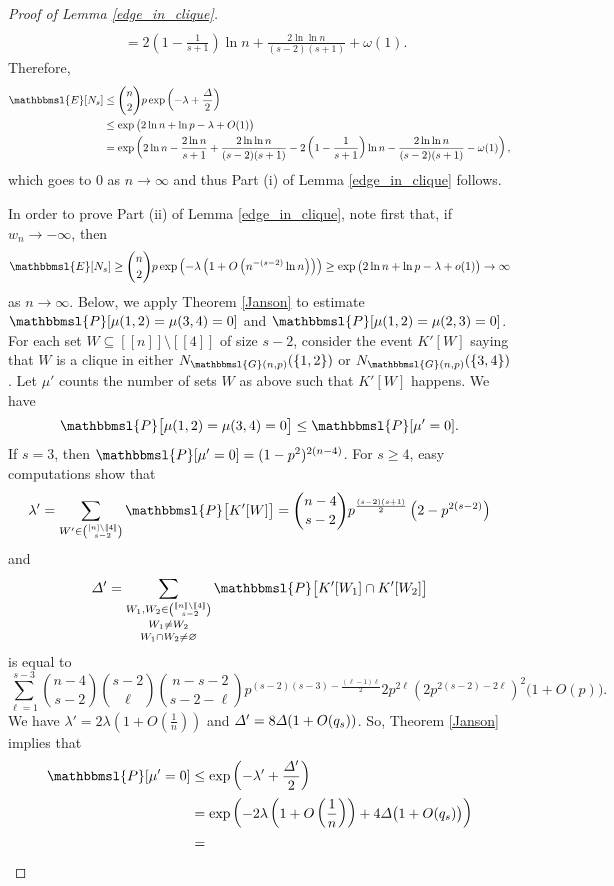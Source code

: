 \documentclass[hidelinks, 11pt]{article}
\theoremstyle{plain}
\theoremstyle{definition}
\begin{document}
\begin{proof}[Proof of Lemma \ref{edge_in_clique}]
\begin{align*}
\\&=2\left(1-\frac{1}{s+1}\right)\ln n+\frac{2\ln\ln n}{(s-2)(s+1)}+\omega(1).
\end{align*}
Therefore,
\begin{align*}
\mathbbmsl{E}[N_s]&\leq{n\choose 2}p\exp\left(-\lambda+\frac{\mathnormal{\Delta}}{2}\right)\\&\leq\exp\big(2\ln n+\ln p-\lambda+O(1)\big)\\
&=\exp\left(2\ln n-\frac{2\ln n}{s+1}+\frac{2\ln\ln n}{(s-2)(s+1)}-2\left(1-\frac{1}{s+1}\right)\ln n-\frac{2\ln\ln n}{(s-2)(s+1)}-\omega(1)\right),
\end{align*}
which goes to $0$ as $n\to\infty$ and thus  Part (i)  of Lemma \ref{edge_in_clique} follows.


In order  to  prove  Part (ii)  of Lemma \ref{edge_in_clique}, note first that,  if $w_n\to-\infty$, then
$$\mathbbmsl{E}[N_s]\geq{n\choose 2}p\exp\left(-\lambda\left(1+O\left(n^{-(s-2)}\ln n\right)\right)\right)\geq\exp\big(2\ln n+\ln p-\lambda+o(1)\big)\to\infty$$ as $n\to\infty$.
Below, we   apply   Theorem \ref{Janson} to   estimate $\mathbbmsl{P}[\mu(1,2)=\mu(3,4)=0]$ and $\mathbbmsl{P}[\mu(1,2)=\mu(2,3)=0]$.
For each set $W\subseteq[\![n]\!]\setminus[\![4]\!]$ of size $s-2$, consider the  event $K'[W]$ saying that   $W$ is a clique in either $N_{\mathbbmsl{G}(n,p)}(\{1, 2\})$ or   $N_{\mathbbmsl{G}(n,p)}(\{3, 4\})$.   Let $\mu'$ counts the number of sets $W$ as above such that $K'[W]$ happens. We have
\begin{equation}
\mathbbmsl{P}\big[\mu(1,2)=\mu(3,4)=0\big]\leq\mathbbmsl{P}[\mu'=0].\label{mu-one}
\end{equation}
If $s=3$, then $\mathbbmsl{P}[\mu'=0]=(1-p^2)^{2(n-4)}$. For $s\geq 4$, easy  computations  show that
$$\lambda'=\sum_{W'\in{[n]\setminus[\![4]\!]\choose s-2}}\mathbbmsl{P}\big[K'[W]\big]={n-4\choose s-2}p^{\frac{(s-2)(s+1)}{2}}\left(2-p^{2(s-2)}\right)$$   and
$$\mathnormal{\Delta}'=\mathop{\mathop{\sum_{W_1,W_2\in{[\![n]\!]\setminus[\![4]\!]\choose s-2}}}_{W_1\neq W_2}}_{W_1\cap W_2\neq\varnothing}\mathbbmsl{P}\big[K'[W_1]\cap K'[W_2]\big]$$ is equal to $$\sum_{\ell=1}^{s-3}{n-4\choose s-2}{s-2\choose\ell}{n-s-2\choose s-2-\ell}
p^{(s-2)(s-3)-\frac{(\ell-1)\ell}{2}}2p^{2\ell}\left(2p^{2(s-2)-2\ell}\right)^2\big(1+O(p)\big).$$
We have $\lambda'=2\lambda(1+O(\frac{1}{n}))$ and $\mathnormal{\Delta}'=8\mathnormal{\Delta}(1+O(q_s))$.
So, Theorem \ref{Janson} implies that
\begin{align}
\mathbbmsl{P}[\mu'=0]&\leq\exp\left(-\lambda'+\frac{\mathnormal{\Delta}'}{2}\right)\nonumber\\&=\exp\left(-2\lambda\left(1+O\left(\frac{1}{n}\right)\right)+4\mathnormal{\Delta}\big(1+O(q_s)\big)\right)\nonumber\\&=

\end{align}
\end{proof}
\end{document}
